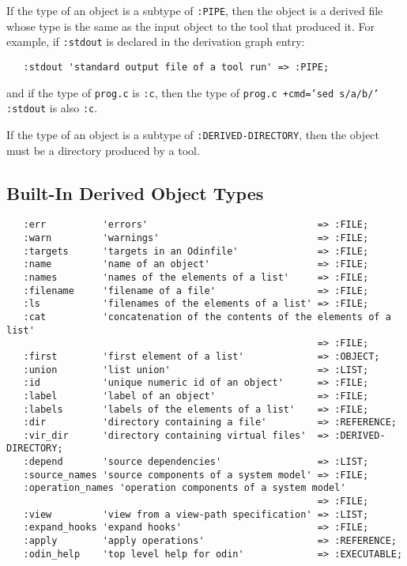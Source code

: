 \documentclass[hidelinks]{report}
\newcommand{\ex}{\tt}   %
\begin{document}
If the type of an object is a subtype of {\ex :PIPE},
then the object is a derived file whose type is the same
as the input object to the tool that produced it.
For example, if {\ex :stdout} is declared in the derivation graph entry:
\begin{verbatim}
   :stdout 'standard output file of a tool run' => :PIPE;
\end{verbatim}
and if the type of {\ex prog.c} is {\ex :c},
then the type of {\ex prog.c +cmd='sed s/a/b/' :stdout} is also {\ex :c}.

If the type of an object is a subtype of {\ex :DERIVED-DIRECTORY},
then the object must be a directory produced by a tool.

\subsection{Built-In Derived Object Types}
\label{builtindrv}

\begin{verbatim}
   :err          'errors'                              => :FILE;
   :warn         'warnings'                            => :FILE;
   :targets      'targets in an Odinfile'              => :FILE;
   :name         'name of an object'                   => :FILE;
   :names        'names of the elements of a list'     => :FILE;
   :filename     'filename of a file'                  => :FILE;
   :ls           'filenames of the elements of a list' => :FILE;
   :cat          'concatenation of the contents of the elements of a list'
                                                       => :FILE;
   :first        'first element of a list'             => :OBJECT;
   :union        'list union'                          => :LIST;
   :id           'unique numeric id of an object'      => :FILE;
   :label        'label of an object'                  => :FILE;
   :labels       'labels of the elements of a list'    => :FILE;
   :dir          'directory containing a file'         => :REFERENCE;
   :vir_dir      'directory containing virtual files'  => :DERIVED-DIRECTORY;
   :depend       'source dependencies'                 => :LIST;
   :source_names 'source components of a system model' => :FILE;
   :operation_names 'operation components of a system model'
                                                       => :FILE;
   :view         'view from a view-path specification' => :LIST;
   :expand_hooks 'expand hooks'                        => :FILE;
   :apply        'apply operations'                    => :REFERENCE;
   :odin_help    'top level help for odin'             => :EXECUTABLE;
\end{verbatim}
\end{document}
